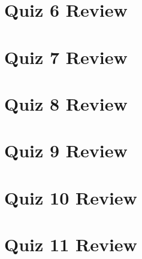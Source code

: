 \documentclass{article}
\begin{document}
\newpage
\section{Quiz 6 Review}

\newpage
\section{Quiz 7 Review}

\newpage
\section{Quiz 8 Review}

\newpage
\section{Quiz 9 Review}

\newpage
\section{Quiz 10 Review}

\newpage
\section{Quiz 11 Review}
\end{document}
